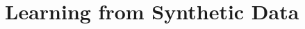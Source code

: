 

\chapter{Learning from Synthetic Data}

\def\figref#1{Fig.~\ref{fig:#1}}

\ifpdf
    \graphicspath{{Chapter4/Figs/Raster/}{Chapter4/Figs/PDF/}{Chapter4/Figs/}}
\else
    \graphicspath{{Chapter4/Figs/Vector/}{Chapter4/Figs/}}
\fi



\def\R#1{{\mathbb{R}^{#1}}}
\def\RR#1#2{{\mathbb{R}^{#1 \times #2}}}
\def\posn{\phi}
\def\pose{\theta}
\def\npose{P}
\def\shape{\beta}
\def\nshape{B}
\def\verts{\nu}
\def\nverts{V}
\def\jointselect{\mathtt{K}}
\def\njoints{J}
\def\proj{\pi}
\def\bvec#1{\bar{#1}}
\def\LL#1{L_{\text{#1}}}
\def\lterm#1{\subsubsection{$\LL{#1}$:}}
\def\E#1{{E_{\text{#1}}}}
\def\ss#1{\vspace{-0ex}\subsubsection{#1}}

